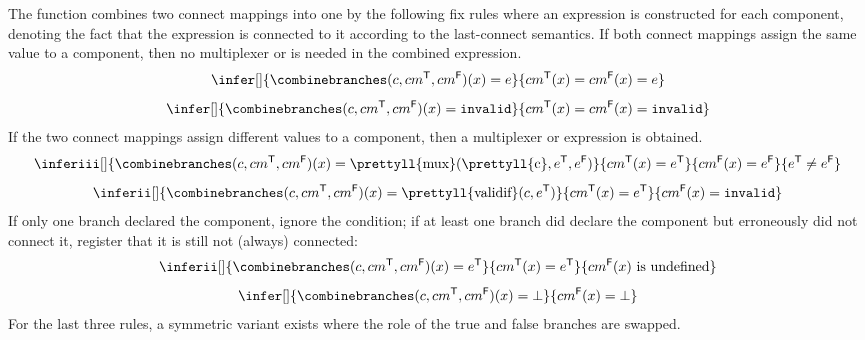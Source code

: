 The function \combinebranches combines two connect mappings into one by the following fix rules %
where an expression is constructed for each component, denoting the fact that the expression is connected to it according to the last-connect semantics.
If both connect mappings assign the same value to a component, then no multiplexer or  is needed in the combined expression.
\begin{gather*}
 \label{rule-expandwhen-combine-1}
    \infer[]
    {\combinebranches(c, cm^\mathsf{T},cm^\mathsf{F})(x) = e}
    {cm^\mathsf{T}(x) = cm^\mathsf{F}(x) = e}
\\[1ex]
 \label{rule-expandwhen-combine-2}
    \infer[]
    {\combinebranches(c, cm^\mathsf{T},cm^\mathsf{F})(x) = {\tt invalid}}
    {cm^\mathsf{T}(x) = cm^\mathsf{F}(x) = {\tt invalid}}
\end{gather*}
If the two connect mappings assign different values to a component, then a multiplexer or  expression is obtained.
\begin{gather*}
 \label{rule-expandwhen-combine-3}
    \inferiii[]
    {\combinebranches(c, cm^\mathsf{T},cm^\mathsf{F})(x) = \text{\prettyll{mux}}(\text{\prettyll{c}},e^\mathsf{T},e^\mathsf{F})}
    {cm^\mathsf{T}(x) = e^\mathsf{T}}
    {cm^\mathsf{F}(x) = e^\mathsf{F}}
    {e^\mathsf{T} \not= e^\mathsf{F}}
\\[1ex]
 \label{rule-expandwhen-combine-4}
    \inferii[]
    {\combinebranches(c, cm^\mathsf{T},cm^\mathsf{F})(x) = \text{\prettyll{validif}}(c,e^\mathsf{T})}
    {cm^\mathsf{T}(x) = e^\mathsf{T}}
    {cm^\mathsf{F}(x) = {\tt invalid}}
\end{gather*}
If only one branch declared the component, ignore the condition;
if at least one branch did declare the component but erroneously did not connect it,
register that it is still not (always) connected:
\begin{gather*}
 \label{rule-expandwhen-combine-5}
    \inferii[]
    {\combinebranches(c, cm^\mathsf{T},cm^\mathsf{F})(x) = e^\mathsf{T}}
    {cm^\mathsf{T}(x) = e^\mathsf{T}}
    {cm^\mathsf{F}(x) \text{ is undefined}}
\\[1ex]
 \label{rule-expandwhen-combine-6}
    \infer[]
    {\combinebranches(c, cm^\mathsf{T},cm^\mathsf{F})(x) =\bot}
    {cm^\mathsf{F}(x) = \bot}
\end{gather*}
For the last three rules, a symmetric variant exists where the role of the true and false branches are swapped.

